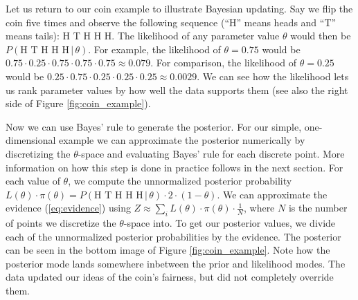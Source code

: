 \documentclass[12pt, a4paper]{report}
\begin{document}
Let us return to our coin example to illustrate Bayesian updating.
Say we flip the coin five times and observe the following sequence (``H'' means heads and ``T'' means tails): H T H H H.
The likelihood of any parameter value $\theta$ would then be $P(\textrm{H T H H H} \, | \, \theta)$.
For example, the likelihood of $\theta = 0.75$ would be $0.75 \cdot 0.25 \cdot 0.75 \cdot 0.75 \cdot 0.75 \approx 0.079$.
For comparison, the likelihood of $\theta = 0.25$ would be $0.25 \cdot 0.75 \cdot 0.25 \cdot 0.25 \cdot 0.25 \approx 0.0029$.
We can see how the likelihood lets us rank parameter values by how well the data supports them (see also the right side of Figure \ref{fig:coin_example}).

Now we can use Bayes' rule to generate the posterior.
For our simple, one-dimensional example we can approximate the posterior numerically by discretizing the $\theta$-space and evaluating Bayes' rule for each discrete point.
More information on how this step is done in practice follows in the next section.
For each value of $\theta$, we compute the unnormalized posterior probability $L(\theta) \cdot \pi(\theta) = P(\textrm{H T H H H} \, | \, \theta) \cdot 2 \cdot (1 - \theta)$.
We can approximate the evidence (\ref{eq:evidence}) using $Z \approx \sum_{i} L(\theta) \cdot \pi(\theta) \cdot \frac{1}{N}$, where $N$ is the number of points we discretize the $\theta$-space into.
To get our posterior values, we divide each of the unnormalized posterior probabilities by the evidence.
The posterior can be seen in the bottom image of Figure \ref{fig:coin_example}.
Note how the posterior mode lands somewhere inbetween the prior and likelihood modes.
The data updated our ideas of the coin's fairness, but did not completely override them.
\end{document}
